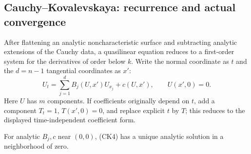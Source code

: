 \subsection{Cauchy--Kovalevskaya: recurrence and actual convergence}
\label{sec:4-ck}
After flattening an analytic noncharacteristic surface and subtracting
analytic extensions of the Cauchy data, a quasilinear equation reduces
to a first-order system for the derivatives of order below $k$.
Write the normal coordinate as $t$ and the $d=n-1$ tangential
coordinates as $x'$:
\[
 U_t=\sum_{j=1}^dB_j(U,x')U_{x_j}+c(U,x'),\qquad U(x',0)=0 .
 \tag{CK4}
\]
Here $U$ has $m$ components.
If coefficients originally depend on $t$, add a component
$T_t=1$, $T(x',0)=0$, and replace explicit $t$ by $T$;
this reduces to the displayed time-independent coefficient form.
\begin{theorem}
For analytic $B_j,c$ near $(0,0)$, (CK4) has a unique analytic
solution in a neighborhood of zero.
\end{theorem}
